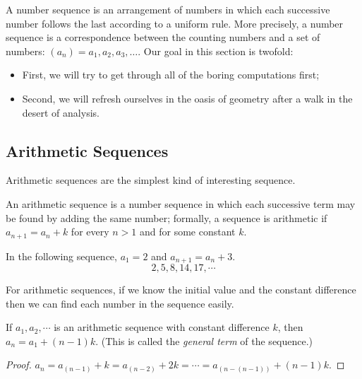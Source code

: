 



A number sequence is an arrangement of numbers in which each successive number follows the last according to
a uniform rule. More precisely, a number sequence is a correspondence between the counting numbers and a set
of numbers: $ (a_n) = a_1, a_2, a_3, \dots $. Our goal in this section is twofold:
\begin{itemize}
  \item First, we will try to get through all of the boring computations first;
  \item Second, we will refresh ourselves in the oasis of geometry after a walk in the desert of analysis.
\end{itemize}

\subsection*{Arithmetic Sequences}
Arithmetic sequences are the simplest kind of interesting sequence.
\begin{defn}
  An arithmetic sequence is a number sequence in which each successive term may be found by adding the
  same number; formally, a sequence is arithmetic if $ a_{n + 1} = a_n + k $ for every $ n > 1 $ and for
  some constant $ k $.
\end{defn}
\begin{ex}
  In the following sequence, $ a_1 = 2 $ and $ a_{n + 1} = a_n + 3 $.
  \begin{displaymath}
    2, 5, 8, 14, 17, \cdots
  \end{displaymath}
\end{ex}

For arithmetic sequences, if we know the initial value and the constant difference then we can find each number
in the sequence easily.

\begin{thm}
  If $ a_1, a_2, \cdots $ is an arithmetic sequence with constant difference $ k $, then $ a_n = a_1 + (n - 1)k $.
  (This is called the \emph{general term} of the sequence.)
\end{thm}
\begin{proof}
  $ a_n = a_{(n - 1)} + k = a_{(n - 2)} + 2k = \cdots = a_{(n - (n - 1))} + (n - 1)k $.
\end{proof}

